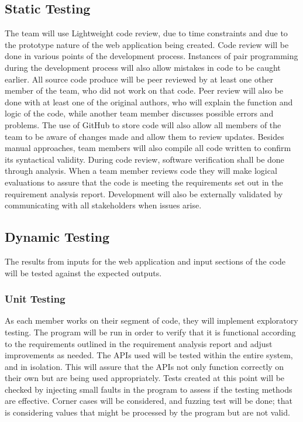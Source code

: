 \documentclass[]{IEEEtran}
\begin{document}
	\subsection{Static Testing}
	The team will use Lightweight code review, due to time constraints and due to the prototype nature of the web application being created. Code review will be done in various points of the development process. Instances of pair programming during the development process will also allow mistakes in code to be caught earlier.  All source code produce will be peer reviewed by at least one other member of the team, who did not work on that code. Peer review will also be done with at least one of the original authors, who will explain the function and logic of the code, while another team member discusses possible errors and problems. The use of GitHub to store code will also allow all members of the team to be aware of changes made and allow them to review updates. Besides manual approaches, team members will also compile all code written to confirm its syntactical validity.
During code review, software verification shall be done through analysis. When a team member reviews code they will make logical evaluations to assure that the code is meeting the requirements set out in the requirement analysis report.
Development will also be externally validated by communicating with all stakeholders when issues arise.

	\subsection{Dynamic Testing}
	The results from inputs for the web application and input sections of the code will be tested against the expected outputs.
	
	\subsubsection{Unit Testing}
	As each member works on their segment of code, they will implement exploratory testing. The program will be run in order to verify that it is functional according to the requirements outlined in the requirement analysis report and adjust improvements as needed. The APIs used will be tested within the entire system, and in isolation. This will assure that the APIs not only function correctly on their own but are being used appropriately. Tests created at this point will be checked by injecting small faults in the program to assess if the testing methods are effective. Corner cases will be considered, and fuzzing test will be done; that is considering values that might be processed by the program but are not valid.
	
\end{document}
